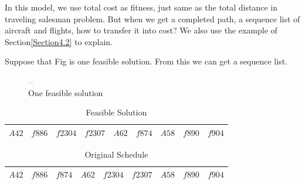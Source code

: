 \documentclass[senior]{IPSstyle}
\begin{document}
 In this model, we use total cost as fitness, just same as the total distance in traveling salesman problem. But when we get a completed path, a sequence list of aircraft and flights, how to transfer it into cost? We also use the example of Section\ref{Section4.2} to explain.

Suppose that Fig is one feasible solution. From this we can get a sequence list.

\begin{figure}[h]
    \centering
    \includegraphics[width=10]{MasterThesis-master/feasible solution1.png}
    \caption{One feasible solution}
    \label{fig:one feasible solution}
\end{figure}

\begin{table}[h]
\renewcommand{\arraystretch}{1.2}
\caption{Feasible Solution}
\label{outcome}
\begin{center}
\begin{tabular}{|c|c|c|c|c|c|c|c|c|}
\hline 
\multicolumn{1}{c|}{\(A42\)}
&\multicolumn{1}{c|}{\(f886\)}
&\multicolumn{1}{c|}{\(f2304\)}
&\multicolumn{1}{c|}{\(f2307\)}
&\multicolumn{1}{c|}{\(A62\)}
&\multicolumn{1}{c|}{\(f874\)}
&\multicolumn{1}{c|}{\(A58\)}
&\multicolumn{1}{c|}{\(f890\)}
&\multicolumn{1}{c|}{\(f904\)}\\
\hline
\end{tabular}
\end{center}
\label{piriform fscore}
\end{table}

\begin{table}[h]
\renewcommand{\arraystretch}{1.2}
\caption{Original Schedule}
\label{outcome}
\begin{center}
\begin{tabular}{|c|c|c|c|c|c|c|c|c|}
\hline 
\multicolumn{1}{c|}{\(A42\)}
&\multicolumn{1}{c|}{\(f886\)}
&\multicolumn{1}{c|}{\(f874\)}
&\multicolumn{1}{c|}{\(A62\)}
&\multicolumn{1}{c|}{\(f2304\)}
&\multicolumn{1}{c|}{\(f2307\)}
&\multicolumn{1}{c|}{\(A58\)}
&\multicolumn{1}{c|}{\(f890\)}
&\multicolumn{1}{c|}{\(f904\)}\\
\hline
\end{tabular}
\end{center}
\label{piriform fscore}
\end{table}
\end{document}
